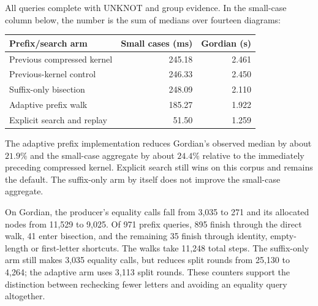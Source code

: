 All queries complete with UNKNOT and group evidence. In the small-case
column below, the number is the sum of medians over fourteen diagrams:
\begin{center}
\begin{tabular}{lrr}
\toprule
Prefix/search arm & Small cases (ms) & Gordian (s)\\
\midrule
Previous compressed kernel & 245.18 & 2.461\\
Previous-kernel control & 246.33 & 2.450\\
Suffix-only bisection & 248.09 & 2.110\\
Adaptive prefix walk & 185.27 & 1.922\\
Explicit search and replay & 51.50 & 1.259\\
\bottomrule
\end{tabular}
\end{center}
The adaptive prefix implementation reduces Gordian's observed median by
about $21.9\%$ and the small-case aggregate by about $24.4\%$ relative
to the immediately preceding compressed kernel. Explicit search still wins
on this corpus and remains the default. The suffix-only arm by itself
does not improve the small-case aggregate.

On Gordian, the producer's equality calls fall from 3,035 to 271 and its
allocated nodes from 11,529 to 9,025. Of 971 prefix queries, 895 finish
through the direct walk, 41 enter bisection, and the remaining 35 finish
through identity, empty-length or first-letter shortcuts. The walks take
11,248 total steps. The suffix-only arm still makes 3,035 equality calls,
but reduces split rounds from 25,130 to 4,264; the adaptive arm uses 3,113
split rounds. These counters support the distinction between rechecking
fewer letters and avoiding an equality query altogether.

